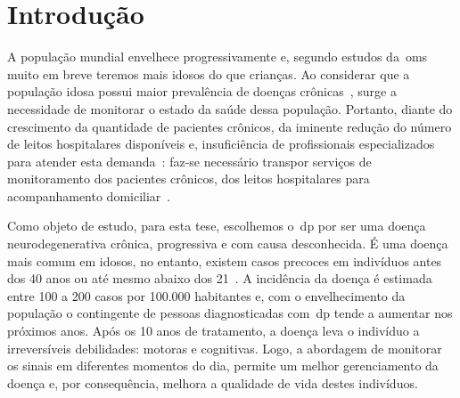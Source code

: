\chapter{Introdu\c{c}\~{a}o} \label{chapter:intro}

A população mundial envelhece progressivamente e, segundo estudos da~\ac{oms}~\cite{ageing2011} muito em breve teremos mais idosos do que crianças. Ao considerar que a população idosa possui maior prevalência de doenças crônicas~\cite{prevcronica2009}, surge a necessidade de monitorar o estado da saúde dessa população. Portanto, diante do crescimento da quantidade de pacientes crônicos, da iminente redução do número de leitos hospitalares disponíveis e, insuficiência de profissionais especializados para atender esta demanda~\cite{healthmonitoring2013}: faz-se necessário transpor serviços de monitoramento dos pacientes crônicos, dos leitos hospitalares para acompanhamento domiciliar~\cite{homecarebrazil2011}. 

Como objeto de estudo, para esta tese, escolhemos o~\ac{dp} por ser uma doença neurodegenerativa crônica, progressiva e com causa desconhecida. É uma doença mais comum em idosos, no entanto, existem casos precoces em indivíduos antes dos 40 anos ou até mesmo abaixo dos 21~\cite{menezes2003}. A incidência da doença é estimada entre 100 a 200 casos por 100.000 habitantes e, com o envelhecimento da população o contingente de pessoas diagnosticadas com~\ac{dp} tende a aumentar nos próximos anos. Após os 10 anos de tratamento, a doença leva o indivíduo a irreversíveis debilidades: motoras e cognitivas. Logo, a abordagem de monitorar os sinais em diferentes momentos do dia, permite um melhor gerenciamento da doença e, por consequência, melhora a qualidade de vida destes indivíduos.

